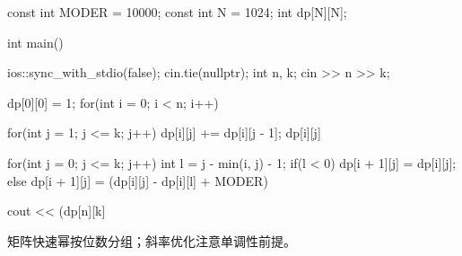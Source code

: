 \begin{codeline}
const int MODER = 10000;
const int N = 1024;
int dp[N][N];

int main() {
    ios::sync_with_stdio(false);
    cin.tie(nullptr);
    int n, k;
    cin >> n >> k;

    dp[0][0] = 1;
    for(int i = 0; i < n; i++) {

        for(int j = 1; j <= k; j++) {
            dp[i][j] += dp[i][j - 1];
            dp[i][j] %
        }

        for(int j = 0; j <= k; j++) {
            int l = j - min(i, j) - 1;
            if(l < 0) {
                dp[i + 1][j] = dp[i][j];
            } else {
                dp[i + 1][j] = (dp[i][j] - dp[i][l] + MODER) %
            }
        }
    }
    cout << (dp[n][k] %
}
\end{codeline}
\begin{warnbox}
矩阵快速幂按位数分组；斜率优化注意单调性前提。
\end{warnbox}

